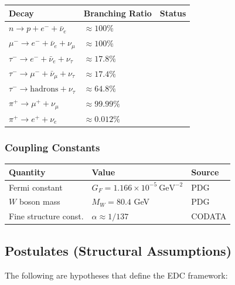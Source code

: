 \begin{center}
\begin{tabular}{lll}
\toprule
\textbf{Decay} & \textbf{Branching Ratio} & \textbf{Status} \\
\midrule
$n \to p + e^- + \bar\nu_e$ & $\approx 100\%$ & \tagBL{} \\
$\mu^- \to e^- + \bar\nu_e + \nu_\mu$ & $\approx 100\%$ & \tagBL{} \\
$\tau^- \to e^- + \bar\nu_e + \nu_\tau$ & $\approx 17.8\%$ & \tagBL{} \\
$\tau^- \to \mu^- + \bar\nu_\mu + \nu_\tau$ & $\approx 17.4\%$ & \tagBL{} \\
$\tau^- \to \text{hadrons} + \nu_\tau$ & $\approx 64.8\%$ & \tagBL{} \\
$\pi^+ \to \mu^+ + \nu_\mu$ & $\approx 99.99\%$ & \tagBL{} \\
$\pi^+ \to e^+ + \nu_e$ & $\approx 0.012\%$ & \tagBL{} \\
\bottomrule
\end{tabular}
\end{center}

\subsubsection{Coupling Constants}

\begin{center}
\begin{tabular}{lll}
\toprule
\textbf{Quantity} & \textbf{Value} & \textbf{Source} \\
\midrule
Fermi constant & $G_F = 1.166 \times 10^{-5}~\text{GeV}^{-2}$ & PDG \\
$W$ boson mass & $M_W = 80.4$ GeV & PDG \\
Fine structure const. & $\alpha \approx 1/137$ & CODATA \\
\bottomrule
\end{tabular}
\end{center}

\subsection{Postulates (Structural Assumptions)}

The following are hypotheses that define the EDC framework:

